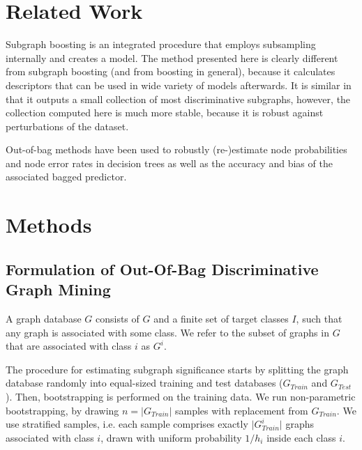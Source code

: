 \documentclass{article}
\begin{document}
\section{Related Work}

Subgraph boosting \cite{saigo09gboost} is an integrated procedure that employs subsampling internally and creates a model. The method presented here is clearly different from subgraph boosting (and from boosting in general), because it calculates descriptors that can be used in wide variety of models afterwards. It is similar in that it outputs a small collection of most discriminative subgraphs, however, the collection computed here is much more stable, because it is robust against perturbations of the dataset.

Out-of-bag methods have been used to robustly (re-)estimate node probabilities and node error rates in decision trees \cite{breiman96oob} as well as the accuracy \cite{bylander02estimating, breiman96oob} and bias \cite{bylander02estimating} of the associated bagged predictor.

\section{Methods}
\subsection{Formulation of Out-Of-Bag Discriminative Graph Mining}

A graph database $G$ consists of $G$ and a finite set of target classes $I$,
such that any graph is associated with some class. We refer to the subset of
graphs in $G$ that are associated with class $i$ as $G^i$.

The procedure for estimating subgraph significance starts by splitting the graph
database randomly into equal-sized training and test databases ($G_{Train}$ and
$G_{Test}$). Then, bootstrapping is performed on the training data. We run
non-parametric bootstrapping, by drawing $n=\vert G_{Train}\vert$ samples with
replacement from  $G_{Train}$. We use stratified samples, i.e. each sample
comprises exactly $\vert G_{Train}^i\vert$ graphs associated with class $i$, drawn with
uniform probability $1/h_i$ inside each class $i$.
\end{document}
